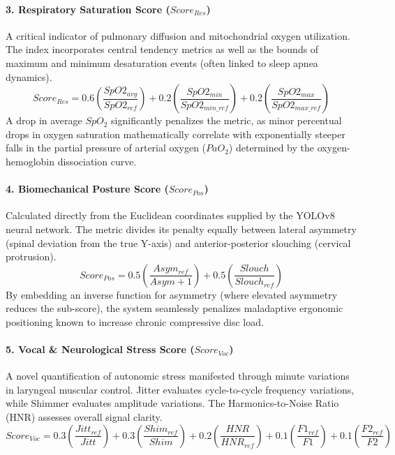 \documentclass[11pt,a4paper]{article}
\begin{document}
\paragraph{3. Respiratory Saturation Score ($Score_{Res}$)}
A critical indicator of pulmonary diffusion and mitochondrial oxygen utilization. The index incorporates central tendency metrics as well as the bounds of maximum and minimum desaturation events (often linked to sleep apnea dynamics).
\begin{equation}
Score_{Res} = 0.6 \left(\frac{SpO2_{avg}}{SpO2_{ref}}\right) + 0.2 \left(\frac{SpO2_{min}}{SpO2_{min\_ref}}\right) + 0.2 \left(\frac{SpO2_{max}}{SpO2_{max\_ref}}\right)
\end{equation}
A drop in average $SpO_2$ significantly penalizes the metric, as minor percentual drops in oxygen saturation mathematically correlate with exponentially steeper falls in the partial pressure of arterial oxygen ($PaO_2$) determined by the oxygen-hemoglobin dissociation curve.

\paragraph{4. Biomechanical Posture Score ($Score_{Pos}$)}
Calculated directly from the Euclidean coordinates supplied by the YOLOv8 neural network. The metric divides its penalty equally between lateral asymmetry (spinal deviation from the true Y-axis) and anterior-posterior slouching (cervical protrusion).
\begin{equation}
Score_{Pos} = 0.5 \left(\frac{Asym_{ref}}{Asym + 1}\right) + 0.5 \left(\frac{Slouch}{Slouch_{ref}}\right)
\end{equation}
By embedding an inverse function for asymmetry (where elevated asymmetry reduces the sub-score), the system seamlessly penalizes maladaptive ergonomic positioning known to increase chronic compressive disc load.

\paragraph{5. Vocal \& Neurological Stress Score ($Score_{Voc}$)}
A novel quantification of autonomic stress manifested through minute variations in laryngeal muscular control. Jitter evaluates cycle-to-cycle frequency variations, while Shimmer evaluates amplitude variations. The Harmonics-to-Noise Ratio (HNR) assesses overall signal clarity.
\begin{equation}
Score_{Voc} = 0.3 \left(\frac{Jitt_{ref}}{Jitt}\right) + 0.3 \left(\frac{Shim_{ref}}{Shim}\right) + 0.2 \left(\frac{HNR}{HNR_{ref}}\right) + 0.1 \left(\frac{F1_{ref}}{F1}\right) + 0.1 \left(\frac{F2_{ref}}{F2}\right)
\end{equation}
\end{document}
